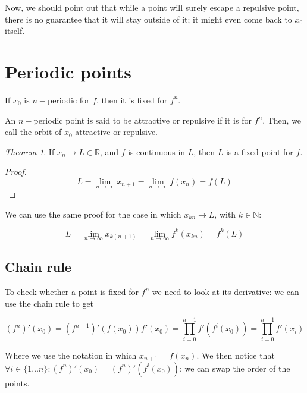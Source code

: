 \documentclass[12pt,a4paper]{report}
\numberwithin{equation}{section}
\theoremstyle{definition}
\theoremstyle{remark}
\newtheorem{theorem}{Theorem}[section]
\begin{document}
Now, we should point out that while a point will surely escape a repulsive point, there is no guarantee that it will stay outside of it; it might even come back to $x_0$ itself.

\section{Periodic points}

If $x_0$ is $n-$periodic for $f$, then it is fixed for $f^n$.

An $n-$periodic point is said to be attractive or repulsive if it is for $f^n$. Then, we call the orbit of $x_0$ attractive or repulsive.

\begin{theorem}
If $x_n \rightarrow L \in \mathbb{R}$, and $f$ is continuous in $L$, then $L$ is a fixed point for $f$.
\end{theorem}

\begin{proof}
\begin{equation}
L = \lim_{n\rightarrow \infty} x_{n+1} = \lim_{n \rightarrow \infty} f(x_n) = f(L)
\end{equation}
\end{proof}

We can use the same proof for the case in which $x_{kn} \rightarrow L$, with $k \in \mathbb{N}$:

\begin{equation}
L = \lim_{n\rightarrow \infty} x_{k(n+1)} = \lim_{n \rightarrow \infty} f^k(x_{kn}) = f^k(L) 
\end{equation}

\subsection{Chain rule}

To check whether a point is fixed for $f^n$ we need to look at its derivative: we can use the chain rule to get

\begin{equation}
(f^n)' (x_0) = (f^{n-1})' (f(x_0)) f'(x_0) = \prod_{i=0}^{n-1} f'(f^i(x_0)) =\prod_{i=0}^{n-1} f'(x_i)
\end{equation}

Where we use the notation in which $x_{n+1} = f(x_n)$.
We then notice that $\forall i \in \lbrace 1 \dots n \rbrace: (f^n)' (x_0) = (f^n)'(f^i (x_0))$: we can swap the order of the points.
\end{document}
